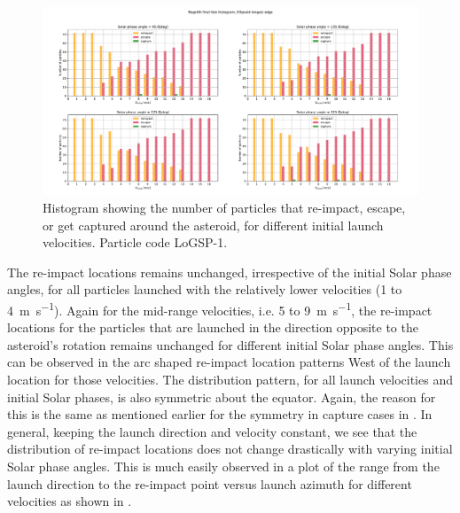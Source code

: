 \begin{figure}[htb]
\centering
\captionsetup{justification=centering}
\includegraphics[angle=90, width=\textwidth, height=\textheight, keepaspectratio=true]{longest_edge_perturbations/3.2Density_1cmSize/final_fate_versus_launch_velocity_histogram_all_solar_phases.pdf}
\caption{Histogram showing the number of particles that re-impact, escape, or get captured around the asteroid, for different initial launch velocities. Particle code LoGSP-1.}
\label{fig:LoGSP_1_final_fate_histogram}
\end{figure}
\FloatBarrier
The re-impact locations remains unchanged, irrespective of the initial Solar phase angles, for all particles launched with the relatively lower velocities (1 to \SI{4}{\metre\per\second}). Again for the mid-range velocities, i.e. 5 to \SI{9}{\metre\per\second}, the re-impact locations for the particles that are launched in the direction opposite to the asteroid's rotation remains unchanged for different initial Solar phase angles. This can be observed in the arc shaped re-impact location patterns West of the launch location for those velocities. The distribution pattern, for all launch velocities and initial Solar phases, is also symmetric about the equator. Again, the reason for this is the same as mentioned earlier for the symmetry in capture cases in . In general, keeping the launch direction and velocity constant, we see that the distribution of re-impact locations does not change drastically with varying initial Solar phase angles. This is much easily observed in a plot of the range from the launch direction to the re-impact point versus launch azimuth for different velocities as shown in .
%
\newline\newline
%
